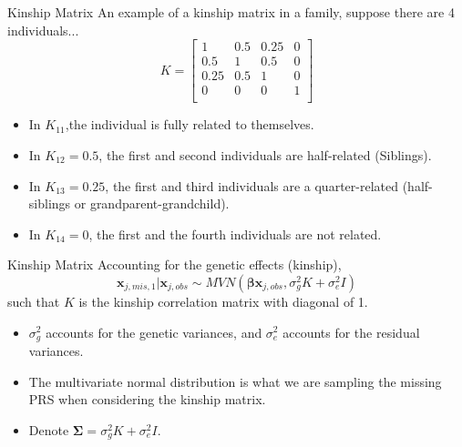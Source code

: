 \documentclass [aspectratio=169]{beamer}
\begin{document}
\begin{frame}{Kinship Matrix}
    An example of a kinship matrix in a family, suppose there are 4 individuals...
    \[
K = \begin{bmatrix}
1    & 0.5  & 0.25 & 0 \\
0.5  & 1    & 0.5  & 0 \\
0.25 & 0.5 & 1    & 0 \\
0    & 0    & 0    & 1 \\
\end{bmatrix}
\]
\begin{itemize} 
    \item In $K_{11}$,the individual is fully related to themselves. 
    \item In $K_{12}=0.5$, the first and second individuals are half-related (Siblings). 
    \item In $K_{13}=0.25$, the first and third individuals are a quarter-related (half-siblings or grandparent-grandchild). 
    \item In $K_{14}=0$, the first and the fourth individuals are not related. 
\end{itemize}
\end{frame}

\begin{frame}{Kinship Matrix}
    Accounting for the genetic effects (kinship),
    \begin{equation}
        \mathbf{x}_{j,mis,1}|\mathbf{x}_{j,obs}\sim MVN(\boldsymbol{\beta}\mathbf{x}_{j,obs}, \sigma_g^2K+\sigma_e^2I)
    \end{equation}
    such that $K$ is the kinship correlation matrix with diagonal of 1. 
    \begin{itemize} 
        \item $\sigma_g^2$ accounts for the genetic variances, and $\sigma_e^2$ accounts for the residual variances.
        \item The multivariate normal distribution is what we are sampling the missing PRS when considering the kinship matrix. 
        \item Denote $\boldsymbol{\Sigma}=\sigma_g^2K+\sigma_e^2I$.
    \end{itemize}
\end{frame}
\end{document}
